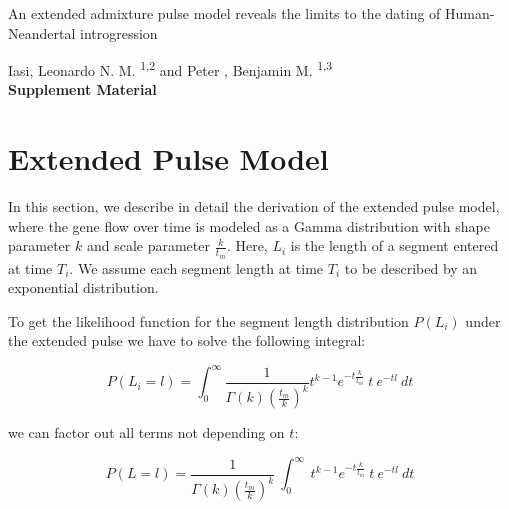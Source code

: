 \documentclass[11pt]{article}
\begin{document}
\begin{titlepage}


    \vspace*{1cm}
        
        
    \begin{center}       
        \large
        \vspace{1cm}
        An extended admixture pulse model reveals the limits to the dating of Human-Neandertal introgression
        
       \vspace{1.0cm}
        \large
        Iasi, Leonardo N. M. \textsuperscript{1,2} and Peter , Benjamin M. \textsuperscript{1,3} \\ 
        
        \vspace{1.0cm}
            \Huge
            \textbf{Supplement Material}
    \end{center} 

            

\end{titlepage}
\section{Extended Pulse Model}

In this section, we describe in detail the derivation of the extended pulse model, where the gene flow over time is modeled as a Gamma distribution with shape parameter $k$ and scale parameter $\frac{k}{t_m}$. Here, $L_i$ is the length of a segment entered at time $T_i$. We assume each segment length at time $T_i$ to be described by an exponential distribution.

To get the likelihood function for the segment length distribution $P(L_i)$ under the extended pulse we have to solve the following integral:

\begin{equation}
\label{eq:Likelihood_function_extended_pulse_1}
    P(L_i=l) = \int_{0}^{\infty} \frac{1}{\Gamma(k)(\frac{t_m}{k})^k}t^{k-1}e^{-t\frac{k}{t_m}}\ t\ e^{-tl} \ dt 
\end{equation}

we can factor out all terms not depending on $t$:

\begin{equation}
\label{eq:Likelihood_function_extended_pulse_2}
    P(L=l) = \frac{1}{\Gamma(k)(\frac{t_m}{k})^k}\ \int_{0}^{\infty}\ t^{k-1}e^{-t\frac{k}{t_m}}\ t\ e^{-tl} \ dt 
\end{equation}
\end{document}
